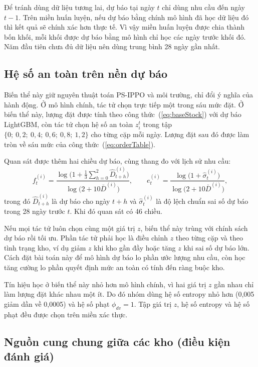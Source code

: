 Để tránh dùng dữ liệu tương lai, dự báo tại ngày $t$ chỉ dùng nhu cầu đến ngày $t - 1$. Trên miền huấn luyện, nếu dự báo bằng chính mô hình đã học dữ liệu đó thì kết quả sẽ chính xác hơn thực tế. Vì vậy miền huấn luyện được chia thành bốn khối, mỗi khối được dự báo bằng mô hình chỉ học các ngày trước khối đó. Năm đầu tiên chưa đủ dữ liệu nên dùng trung bình 28 ngày gần nhất.

\subsection{Hệ số an toàn trên nền dự báo}
\label{subsec:bienTheDuBaoZ}

Biến thể này giữ nguyên thuật toán PS-IPPO và môi trường, chỉ đổi ý nghĩa của hành động. Ở mô hình chính, tác tử chọn trực tiếp một trong sáu mức đặt. Ở biến thể này, lượng đặt được tính theo công thức~(\ref{eq:baseStock}) với dự báo LightGBM, còn tác tử chọn hệ số an toàn $z_i^t$ trong tập $\{0;\ 0{,}2;\ 0{,}4;\ 0{,}6;\ 0{,}8;\ 1{,}2\}$ cho từng cặp mỗi ngày. Lượng đặt sau đó được làm tròn về sáu mức của công thức~(\ref{eq:orderTable}).

Quan sát được thêm hai chiều dự báo, cùng thang đo với lịch sử nhu cầu:
\begin{equation}
    f_t^{(i)} = \frac{\log\bigl(1 + \frac{1}{3}\sum_{h=0}^{2} \hat{D}_{t+h}^{(i)}\bigr)}{\log\bigl(2 + 10\bar{D}^{(i)}\bigr)},
    \qquad
    e_t^{(i)} = \frac{\log\bigl(1 + \hat{\sigma}_t^{(i)}\bigr)}{\log\bigl(2 + 10\bar{D}^{(i)}\bigr)},
    \label{eq:quanSatDuBao}
\end{equation}
trong đó $\hat{D}_{t+h}^{(i)}$ là dự báo cho ngày $t+h$ và $\hat{\sigma}_t^{(i)}$ là độ lệch chuẩn sai số dự báo trong 28 ngày trước $t$. Khi đó quan sát có 46 chiều.

Nếu mọi tác tử luôn chọn cùng một giá trị $z$, biến thể này trùng với chính sách dự báo rồi tối ưu. Phần tác tử phải học là điều chỉnh $z$ theo từng cặp và theo tình trạng kho, ví dụ giảm $z$ khi kho gần đầy hoặc tăng $z$ khi sai số dự báo lớn. Cách đặt bài toán này để mô hình dự báo lo phần ước lượng nhu cầu, còn học tăng cường lo phần quyết định mức an toàn có tính đến ràng buộc kho.

Tín hiệu học ở biến thể này nhỏ hơn mô hình chính, vì hai giá trị $z$ gần nhau chỉ làm lượng đặt khác nhau một ít. Do đó nhóm dùng hệ số entropy nhỏ hơn (0,005 giảm dần về 0,0005) và hệ số phạt $\phi_{dv} = 1$. Tập giá trị $z$, hệ số entropy và hệ số phạt đều được chọn trên miền xác thực.

\subsection{Nguồn cung chung giữa các kho (điều kiện đánh giá)}
\label{subsec:bienTheNguonCung}

